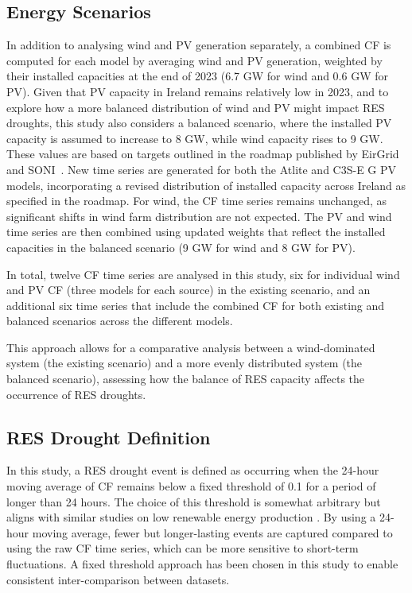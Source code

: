 \documentclass[a4paper, 11pt]{article}
\begin{document}
\subsection{Energy Scenarios}
\label{sec:scenarios}

In addition to analysing wind and PV generation separately, a combined CF is computed for each model by averaging wind and PV generation, weighted by their installed capacities at the end of 2023 (6.7 GW for wind and 0.6 GW for PV). Given that PV capacity in Ireland remains relatively low in 2023, and to explore how a more balanced distribution of wind and PV might impact RES droughts, this study also considers a balanced scenario, where the installed PV capacity is assumed to increase to 8 GW, while wind capacity rises to 9 GW. These values are based on targets outlined in the roadmap published by EirGrid and SONI~\cite{eirgrid2023future}. New time series are generated for both the Atlite and C3S-E G PV models, incorporating a revised distribution of installed capacity across Ireland as specified in the roadmap. For wind, the CF time series remains unchanged, as significant shifts in wind farm distribution are not expected. The PV and wind time series are then combined using updated weights that reflect the installed capacities in the balanced scenario (9 GW for wind and 8 GW for PV).

In total, twelve CF time series are analysed in this study, six for individual wind and PV CF (three models for each source) in the existing scenario, and an additional six time series that include the combined CF for both existing and balanced scenarios across the different models.

This approach allows for a comparative analysis between a wind-dominated system (the existing scenario) and a more evenly distributed system (the balanced scenario), assessing how the balance of RES capacity affects the occurrence of RES droughts.

\subsection{RES Drought Definition}
\label{sec:res_drought}

In this study, a RES drought event is defined as occurring when the 24-hour moving average of CF remains below a fixed threshold of 0.1 for a period of longer than 24 hours. The choice of this threshold is somewhat arbitrary but aligns with similar studies on low renewable energy production \cite{kaspar2019drought, ohba2022drought, mayer2023drought}. By using a 24-hour moving average, fewer but longer-lasting events are captured compared to using the raw CF time series, which can be more sensitive to short-term fluctuations. A fixed threshold approach has been chosen in this study to enable consistent inter-comparison between datasets.
\end{document}
